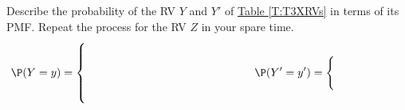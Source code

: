  \begin{classwork}
Describe the probability of the RV $Y$ and $Y'$ of \hyperref[T:T3XRVs]{Table \ref*{T:T3XRVs}} in terms of its PMF.  Repeat the process for the RV $Z$ in your spare time.
 \begin{eqnarray}
 \P(Y=y) =%
 \begin{cases}
 \qquad & \qquad \notag \\
 \qquad & \qquad \notag \\
 \qquad & \qquad \notag \\
 \qquad & \qquad \notag
 \end{cases} 
 & \qquad \qquad \qquad \qquad \qquad
\P(Y'=y') =%
 \begin{cases}
 \qquad & \qquad \notag \\
 \qquad & \qquad \notag 
 \end{cases}
 \end{eqnarray}
 \end{classwork}
 
